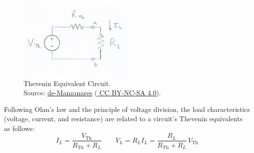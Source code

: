 \documentclass{article}
\begin{document}
    \begin{figure}[htbp]
        \centering
        \includegraphics[width=0.5\textwidth]{TheveninEquivalent}
        \vspace{-1em}
        \caption{Thevenin Equivalent Circuit. \\
        Source:
        \href{https://github.com/de-Manzanares}
        {\color{blue}\underline{de-Manzanares}}
        (\href{https://creativecommons.org/licenses/by-nc-sa/4.0/deed.en}{\color{blue} \underline{CC BY-NC-SA 4.0}}).}

        \label{fig:thev-eq}
    \end{figure}

    \smallskip\noindent
    Following Ohm's law and the principle of voltage division, the load characteristics (voltage, current, and resistance) are related to a circuit's Thevenin equivalents as follows:
    \[
        I_L = \frac{V_{\text{Th}}}{R_{\text{Th}}+R_L}
        \qquad
        V_L = R_L I_L = \frac{R_L}{R_{\text{Th}}+R_L}\,V_{\text{Th}}
    \]
\end{document}
